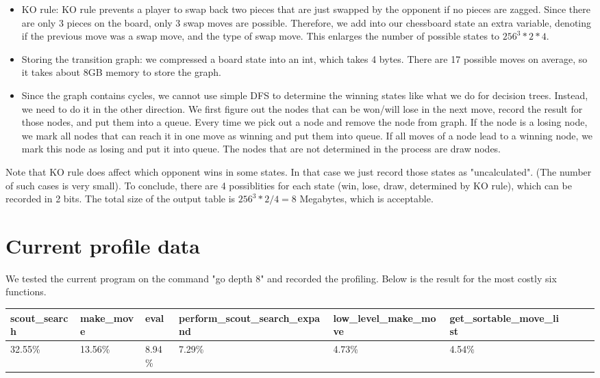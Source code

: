 \documentclass[10pt,twosidep]{article}
\begin{document}
	\begin{itemize}
	\item KO rule: KO rule prevents a player to swap back two pieces that are just swapped by the opponent 
	if no pieces are zagged. Since there are only 3 pieces on the board, only 3 swap moves are possible. 
	Therefore, we add into our chessboard state an extra variable, denoting if the previous move was a swap move, 
	and the type of swap move. This enlarges the number of possible states to $256^3*2*4$.
	\item Storing the transition graph: we compressed a board state into an int, which takes 4 bytes. 
	There are 17 possible moves on average, so it takes about 8GB memory to store the graph. 
	\item Since the graph contains cycles, 
	we cannot use simple DFS to determine the winning states like what we do for decision trees. Instead, 
	we need to do it in the other direction. 
	We first figure out the nodes that can be won/will lose in the next move, 
	record the result for those nodes, and put them into a queue. 
	Every time we pick out a node and remove the node from graph. 
	If the node is a losing node, we mark all nodes that can reach it in one move as winning and put them into queue. 
	If all moves of a node lead to a winning node, we mark this node as losing and put it into queue. 
	The nodes that are not determined in the process are draw nodes. 
	\end{itemize}
	Note that KO rule does affect which opponent wins in some states. In that case 
	we just record those states as "uncalculated". (The number of such cases is very small).
	To conclude, there are 4 possiblities for each state (win, lose, draw, determined by KO rule), 
	which can be recorded in 2 bits. The total size of the output table
	is $256^3*2/4=8$ Megabytes, which is acceptable.

\section{Current profile data}
We tested the current program on the command "go depth 8" and recorded the profiling. Below is the result for the most costly six functions.

\begin{tabular}{ |l|l|l|l|l|l|l|l|l| }
\hline
scout\_search & make\_move & eval & perform\_scout\_search\_expand & low\_level\_make\_move & get\_sortable\_move\_list\\
\hline
32.55\% & 13.56\% & 8.94\% & 7.29\% & 4.73\% & 4.54\%\\
\hline
\end{tabular}
\end{document}
